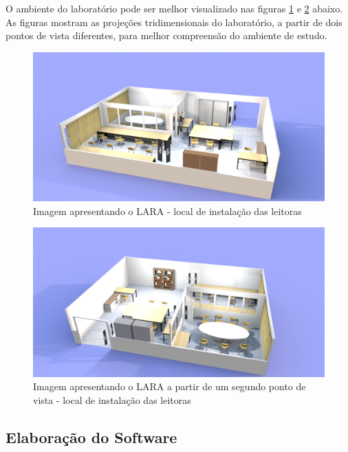 O ambiente do laboratório pode ser melhor visualizado nas figuras \ref{fig:LARA1} e \ref{fig:LARA2} abaixo. As figuras mostram as projeções tridimensionais do laboratório, a partir de dois pontos de vista diferentes, para melhor compreensão do ambiente de estudo.

  \begin{figure}[H]
    \centering
    \includegraphics[width=1\linewidth]{figs/Metodologia/LARA_leitoras-1.png}
    \caption{Imagem apresentando o LARA - local de instalação das leitoras}
    \label{fig:LARA1}
\end{figure}

  \begin{figure}[H]
    \centering
    \includegraphics[width=1\linewidth]{figs/Metodologia/LARA_leitoras-2.png}
    \caption{Imagem apresentando o LARA a partir de um segundo ponto de vista - local de instalação das leitoras}
    \label{fig:LARA2}
\end{figure}





 
 \subsection{Elaboração do Software}
 

